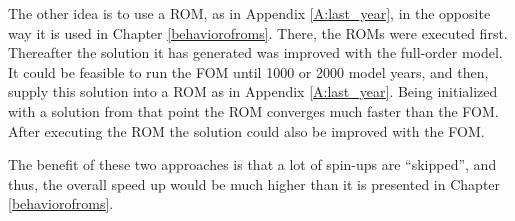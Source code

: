 The other idea is to use a ROM, as in Appendix \ref{A:last_year}, 
in the opposite way it is used in Chapter \ref{behaviorofroms}. There, the ROMs were executed first. Thereafter 
the solution it has generated was improved with the full-order model. It could be feasible to run the FOM until 1000 or 2000 model years, and then, supply this 
solution into a ROM as in Appendix \ref{A:last_year}. Being initialized with a solution from that point the ROM converges much faster than the FOM.
After executing the ROM the solution could also be improved with the FOM.

The benefit of these two approaches is that a lot of spin-ups are ``skipped'', and thus, the overall speed up would be much higher than it is presented in Chapter \ref{behaviorofroms}.



